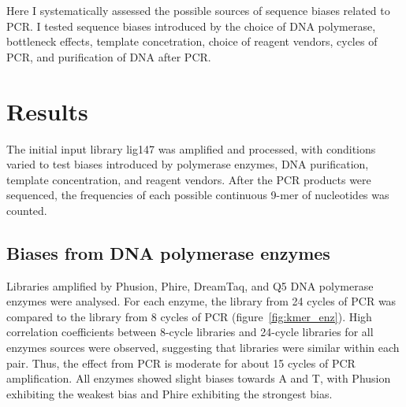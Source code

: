 \documentclass[a4paper, numbers=noenddot]{scrbook}
\begin{document}
Here I systematically assessed the possible sources of sequence biases related to PCR.  I tested sequence biases introduced by the choice of DNA polymerase, bottleneck effects, template concetration, choice of reagent vendors, cycles of PCR, and purification of DNA after PCR.

\section{Results}
\label{sec:pcrbias_results}

The initial input library lig147 was amplified and processed, with conditions varied to test biases introduced by polymerase enzymes, DNA purification, template concentration, and reagent vendors.  After the PCR products were sequenced, the frequencies of each possible continuous 9-mer of nucleotides was counted.

\subsection{Biases from DNA polymerase enzymes}
\label{ssec:pcrbias_result_enz}

Libraries amplified by Phusion, Phire, DreamTaq, and Q5 DNA polymerase enzymes were analysed.  For each enzyme, the library from 24 cycles of PCR was compared to the library from 8 cycles of PCR (figure~\ref{fig:kmer_enz}).  High correlation coefficients between 8-cycle libraries and 24-cycle libraries for all enzymes sources were observed, suggesting that libraries were similar within each pair.  Thus, the effect from PCR is moderate for about 15 cycles of PCR amplification.  All enzymes showed slight biases towards A and T, with Phusion exhibiting the weakest bias and Phire exhibiting the strongest bias.
\end{document}
